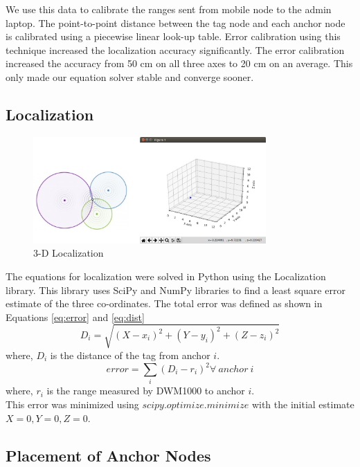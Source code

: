 \documentclass[journal,transmag]{IEEEtran}
\begin{document}
We use this data to calibrate the ranges sent from mobile node to the admin laptop. The point-to-point distance between the tag node and each anchor node is calibrated using a piecewise linear look-up table. Error calibration using this technique increased the localization accuracy significantly. The error calibration increased the accuracy from 50 cm on all three axes to 20 cm on an average. This only made our equation solver stable and converge sooner.




\subsection{Localization}

\begin{figure}[!h]
\centering
\includegraphics[width=3.5in]{3D_localization.png}
\caption{{3-D Localization}}
\label{3dlocalization}
\end{figure}

The equations for localization were solved in Python using the Localization library\cite{kamalshadi:2017}. This library uses SciPy and NumPy libraries to find a least square error estimate of the three co-ordinates. The total error was defined as shown in Equations \ref{eq:error} and \ref{eq:dist}
\begin{equation}
\label{eq:dist}
D_i = \sqrt{(X-x_i)^2 + (Y-y_i)^2 + (Z-z_i)^2}
\end{equation}
where, $D_i$ is the distance of the tag from anchor $i$.\\
\begin{equation}
\label{eq:error}
 error = \sum\limits_{i} (D_i - r_i)^2 \forall\ anchor\ i
\end{equation}
where, $r_i$ is the range measured by DWM1000 to anchor $i$.\\

This error was minimized using $scipy.optimize.minimize$ with the initial estimate $X=0,Y=0,Z=0$.



\subsection{Placement of Anchor Nodes}
\end{document}
